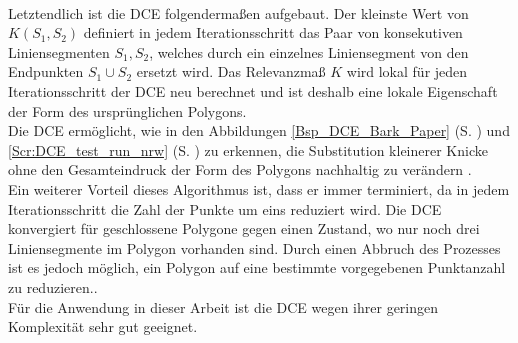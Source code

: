 { \\ 
 Letztendlich ist die DCE folgendermaßen aufgebaut. Der kleinste Wert von $K(S_1,S_2)$ definiert in jedem Iterationsschritt das Paar von konsekutiven Liniensegmenten $S_1, S_2$, welches durch ein einzelnes Liniensegment von den Endpunkten $S_1 \cup S_2$ ersetzt wird. Das Relevanzmaß $K$ wird lokal für jeden Iterationsschritt der DCE neu berechnet und ist deshalb eine lokale Eigenschaft der Form des ursprünglichen Polygons. \\ Die DCE ermöglicht, wie in den Abbildungen \ref{Bsp_DCE_Bark_Paper} (S. \pageref{Bsp_DCE_Bark_Paper}) und \ref{Scr:DCE_test_run_nrw} (S. \pageref{Scr:DCE_test_run_nrw}) zu erkennen, die Substitution kleinerer Knicke ohne den Gesamteindruck der Form des Polygons nachhaltig zu verändern \citep{Barkowsky2000}.
 \\
 Ein weiterer Vorteil dieses Algorithmus ist, dass er immer terminiert, da in jedem Iterationsschritt die Zahl der Punkte um eins reduziert wird. Die DCE konvergiert für geschlossene Polygone gegen einen Zustand, wo nur noch drei Liniensegmente im Polygon vorhanden sind. Durch einen Abbruch des Prozesses ist es jedoch möglich, ein Polygon auf eine bestimmte vorgegebenen Punktanzahl zu reduzieren.\citep{Barkowsky2000}. \\ 
 Für die Anwendung in dieser Arbeit ist die DCE wegen ihrer geringen Komplexität sehr gut geeignet.
}

